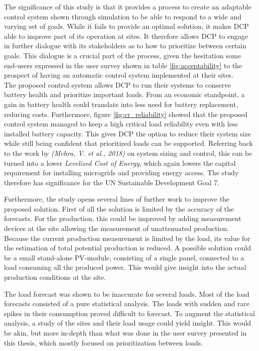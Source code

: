 The significance of this study is that it provides a process to create an adaptable control system shown through simulation to be able to respond to a wide and varying set of goals. While it fails to provide an optimal solution, it makes DCP able to improve part of its operation at sites. It therefore allows DCP to engage in further dialogue with its stakeholders as to how to prioritize between certain goals. This dialogue is a crucial part of the process, given the hesitation some end-users expressed in the user survey shown in table \ref{fig:acceptability} to the prospect of having an automatic control system implemented at their sites.\\

The proposed control system allows DCP to run their systems to conserve battery health and prioritize important loads. From an economic standpoint, a gain in battery health could translate into less need for battery replacement, reducing costs. Furthermore, figure \ref{fig:cr_reliability} showed that the proposed control system managed to keep a high critical load reliability even with less installed battery capacity. This gives DCP the option to reduce their system size while still being confident that prioritized loads can be supported. Referring back to the work by \textit{(Mehra, V. et al., 2018)} on system sizing and control, this can be turned into a lower \textit{Levelized Cost of Energy}, which again lowers the capital requirement for installing microgrids and providing energy access. The study therefore has significance for the UN Sustainable Development Goal 7\cite{un_sdg_7}.

Furthermore, the study opens several lines of further work to improve the proposed solution. First of all the solution is limited by the accuracy of the forecasts. For the production, this could be improved by adding measurement devices at the site allowing the measurement of unattenuated production. Because the current production measurement is limited by the load, its value for the estimation of total potential production is reduced. A possible solution could be a small stand-alone PV-module, consisting of a single panel, connected to a load consuming all the produced power. This would give insight into the actual production conditions at the site. 

The load forecast was shown to be inaccurate for several loads. Most of the load forecasts consisted of a pure statistical analysis. The loads with sudden and rare spikes in their consumption proved difficult to forecast. To augment the statistical analysis, a study of the sites and their load usage could yield insight. This would be akin, but more in-depth than what was done in the user survey presented in this thesis, which mostly focused on prioritization between loads. 

